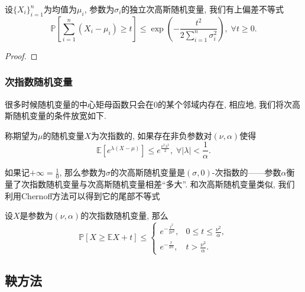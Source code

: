 \begin{proposition}[Hoeffding界]
	设$\{X_i\}_{i=1}^n$为均值为$\mu_i$, 参数为$\sigma_i$的独立次高斯随机变量, 我们有上偏差不等式
	\begin{equation}
		\mathbb{P} \left[ \sum_{i=1}^n (X_i - \mu_i) \geq t \right]
		\leq \exp \left( - \frac{t^2}{2 \sum_{i=1}^n \sigma_i^2} \right ),\; 
		\forall t \geq 0.
	\end{equation}
\end{proposition}
\begin{proof}
	
\end{proof}


\subsubsection{次指数随机变量}

很多时候随机变量的中心矩母函数只会在$0$的某个邻域内存在, 相应地, 我们将次高斯随机变量的条件放宽如下. 
\begin{definition}[次指数随机变量]
	称期望为$\mu$的随机变量$X$为次指数的, 如果存在非负参数对$(\nu, \alpha)$使得
	\begin{equation*}
		\mathbb{E}[ e^{\lambda(X - \mu)} ] 
		\leq e^{\frac{\nu^2 \lambda^2}{2}},\; 
		\forall |\lambda| < \frac{1}{\alpha}. 
	\end{equation*}
\end{definition}
\noindent
如果记$+\infty = \frac10$, 那么参数为$\sigma$的次高斯随机变量是$(\sigma, 0)$-次指数的——参数$\alpha$衡量了次指数随机变量与次高斯随机变量相差“多大”. 
和次高斯随机变量类似, 我们利用Chernoff方法可以得到它的尾部不等式

\begin{theorem}[次指数随机变量的上偏差不等式]\label{thm:UpperDeviationOfSubExpRV}
	设$X$是参数为$(\nu, \alpha)$的次指数随机变量, 那么
	\begin{equation*}
		\mathbb{P}[X \geq \mathbb{E}X + t] \leq 
		\begin{cases}
			e^{-\frac{t^2}{2 \nu^2}}, & 0 \leq t \leq \frac{\nu^2}{\alpha}, \\
			e^{-\frac{t}{2 \alpha}}, & t > \frac{\nu^2}{\alpha}.
		\end{cases}
	\end{equation*}
\end{theorem}



\subsection{鞅方法}

